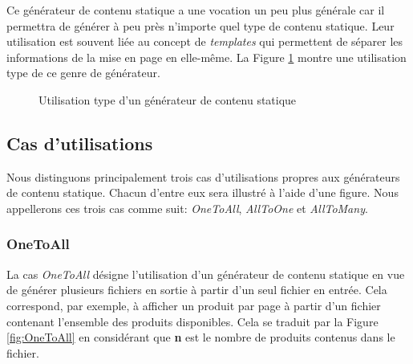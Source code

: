 		 Ce générateur de contenu statique a une vocation un peu plus générale car il permettra de générer à peu près n'importe quel type de contenu statique. Leur utilisation est souvent liée au concept de \textit{templates} qui permettent de séparer les informations de la mise en page en elle-même. La Figure \ref{fig:use_of_generator} montre une utilisation type de ce genre de générateur.\\
		
		\begin{figure}[h]
			\begin{center}
			\caption{Utilisation type d'un générateur de contenu statique}
			\label{fig:use_of_generator}
			\end{center}
		\end{figure}

	\subsection{Cas d'utilisations}
	
		Nous distinguons principalement trois cas d'utilisations propres aux générateurs de contenu statique. Chacun d'entre eux sera illustré à l'aide d'une figure. Nous appellerons ces trois cas comme suit: \textit{OneToAll}, \textit{AllToOne} et \textit{AllToMany}.\\
		
		\subsubsection*{OneToAll}
		
			La cas \textit{OneToAll} désigne l'utilisation d'un générateur de contenu statique en vue de générer plusieurs fichiers en sortie à partir d'un seul fichier en entrée. Cela correspond, par exemple, à afficher un produit par page à partir d'un fichier contenant l'ensemble des produits disponibles. Cela se traduit par la Figure \ref{fig:OneToAll} en considérant que \textbf{n} est le nombre de produits contenus dans le fichier.
			
